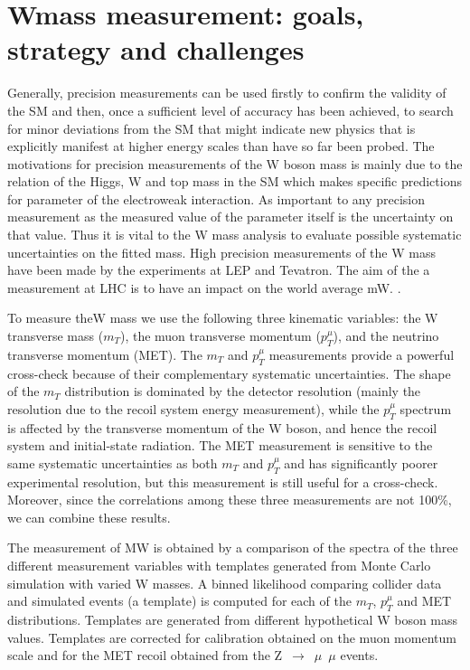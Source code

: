 \section{Wmass measurement: goals, strategy and challenges}
\label{sec:WMstrategy}

Generally, precision measurements can be used firstly to confirm the validity of the SM and then, 
once a sufficient level of accuracy has been
achieved, to search for minor deviations from the SM that might indicate new physics
that is explicitly manifest at higher energy scales than have so far been probed. The
motivations for precision measurements of the W boson mass is mainly due to the relation 
of the Higgs, W and top mass in the SM which makes specific predictions for parameter of the electroweak interaction.
As important to any precision measurement as the measured value of the parameter
itself is the uncertainty on that value. Thus it is vital to the W mass analysis to evaluate
possible systematic uncertainties on the fitted mass. 
High precision measurements of the W mass have been made by the experiments at LEP and Tevatron.
The aim of the a measurement at LHC is to have an impact on the world average mW.
{\color{magenta}{Are there systematics that can be lowered in the combination (?)}}.

To measure theW mass we use the following three kinematic variables: the W transverse mass ($m_{T}$), the muon transverse
momentum ($p_{T}^{\mu}$), and the neutrino transverse momentum (MET).
The $m_{T}$ and $p_{T}^{\mu}$ measurements provide a powerful cross-check because of their complementary
systematic uncertainties. The shape of the $m_{T}$ distribution is dominated by the
detector resolution (mainly the resolution due to the recoil system energy measurement),
while the $p_{T}^{\mu}$ spectrum is affected by the transverse momentum of the W boson, and hence
the recoil system and initial-state radiation.
The MET measurement is sensitive to the same systematic uncertainties as both $m_{T}$ and $p_{T}^{\mu}$ 
and has significantly poorer experimental resolution, but this measurement is still useful
for a cross-check. Moreover, since the correlations among these three measurements
are not 100\%, we can combine these results.

The measurement of MW is obtained by a comparison of the spectra of the three different measurement variables with
templates generated from Monte Carlo simulation with varied W masses.  
A binned likelihood comparing collider data and simulated events (a template) is computed
for each of the $m_{T}$, $p_{T}^{\mu}$ and MET distributions. 
Templates are generated from different hypothetical W boson mass values.
Templates are corrected for calibration obtained on the muon momentum scale and for the MET recoil obtained from the
Z~$\rightarrow$~$\mu$~$\mu$ events.

